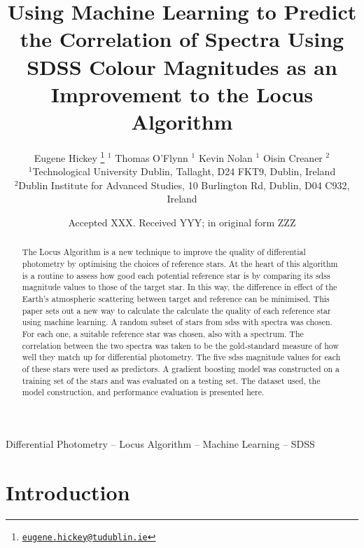 \documentclass[a4paper,fleqn,usenatbib]{mnras}
\title[Predicting Correlation of Spectra Using SDSS Colour
Magnitudes]{Using Machine Learning to Predict the Correlation of Spectra
Using SDSS Colour Magnitudes as an Improvement to the Locus Algorithm}
\author[E. Hickey et al.]{
	Eugene Hickey
			\thanks{\href{mailto:eugene.hickey@tudublin.ie}{\nolinkurl{eugene.hickey@tudublin.ie}}}
				$^{1}$
		Thomas O'Flynn
				$^{1}$
		Kevin Nolan
				$^{1}$
		Oisin Creaner
				$^{2}$
	\\
			$^{1}$Technological University Dublin, Tallaght, D24 FKT9, Dublin,
Ireland\\
			$^{2}$Dublin Institute for Advanced Studies, 10 Burlington Rd,
Dublin, D04 C932, Ireland}
\date{Accepted XXX. Received YYY; in original form ZZZ}
\begin{document}
\label{firstpage}
\pagerange{\pageref{firstpage}--\pageref{lastpage}}


\maketitle

\begin{abstract}
The Locus Algorithm is a new technique to improve the quality of
differential photometry by optimising the choices of reference stars. At
the heart of this algorithm is a routine to assess how good each
potential reference star is by comparing its sdss magnitude values to
those of the target star. In this way, the difference in effect of the
Earth's atmospheric scattering between target and reference can be
minimised. This paper sets out a new way to calculate the calculate the
quality of each reference star using machine learning. A random subset
of stars from sdss with spectra was chosen. For each one, a suitable
reference star was chosen, also with a spectrum. The correlation between
the two spectra was taken to be the gold-standard measure of how well
they match up for differential photometry. The five sdss magnitude
values for each of these stars were used as predictors. A gradient
boosting model was constructed on a training set of the stars and was
evaluated on a testing set. The dataset used, the model construction,
and performance evaluation is presented here.
\end{abstract}

\begin{keywords}
Differential Photometry -- Locus Algorithm -- Machine Learning -- SDSS
\end{keywords}



\hypertarget{introduction}{%
\section{Introduction}\label{introduction}}
\end{document}
